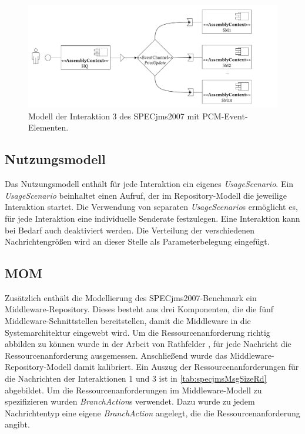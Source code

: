 \begin{figure}
\center
  \includegraphics[width=1\textwidth]{images/evaluation/specjms/evaluationInteraktion3events.pdf}
  \caption{Modell der Interaktion 3 des SPECjms2007 mit PCM-Event-Elementen.}
  \label{img:interaction3system}
\end{figure}


\subsection{Nutzungsmodell}
Das Nutzungsmodell enthält für jede Interaktion ein eigenes \emph{UsageScenario}. Ein \emph{UsageScenario} beinhaltet einen Aufruf, der im Repository-Modell die jeweilige Interaktion startet. Die Verwendung von separaten \emph{UsageScenario}s ermöglicht es, für jede Interaktion eine individuelle Senderate festzulegen. Eine Interaktion kann bei Bedarf auch deaktiviert werden. Die Verteilung der verschiedenen Nachrichtengrößen wird an dieser Stelle als Parameterbelegung eingefügt.

\subsection{MOM}
Zusätzlich enthält die Modellierung des SPECjms2007-Benchmark ein Middleware-Repository. Dieses besteht aus drei Komponenten, die die fünf Middleware-Schnittstellen bereitstellen, damit die Middleware in die Systemarchitektur eingewebt wird. Um die Ressourcenanforderung richtig abbilden zu können wurde in der Arbeit von Rathfelder \cite{Rathfelder2013}, für jede Nachricht die Ressourcenanforderung ausgemessen. Anschließend wurde das Middleware-Repository-Modell damit kalibriert. Ein Auszug der Ressourcenanforderungen für die Nachrichten der Interaktionen 1 und 3 ist in \autoref{tab:specjmsMsgSizeRd} abgebildet. Um die Ressourcenanforderungen im Middleware-Modell zu spezifizieren wurden \emph{BranchAction}s verwendet. Dazu wurde zu jedem Nachrichtentyp eine eigene \emph{BranchAction} angelegt, die die Ressourcenanforderung angibt. 


